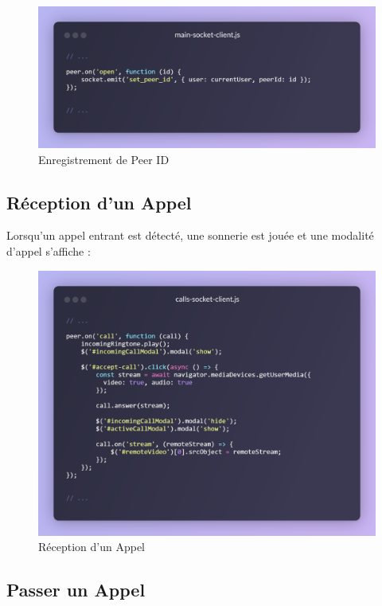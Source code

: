 \begin{figure}[H]
    \centering
    \includegraphics[width=15cm]{assets/annexes/snippet (22).png}
    \caption{ Enregistrement de Peer ID}
\end{figure}

\subsection*{Réception d’un Appel}

Lorsqu'un appel entrant est détecté, une sonnerie est jouée et une modalité d’appel s’affiche :

\begin{figure}[H]
    \centering
    \includegraphics[width=15cm]{assets/annexes/snippet (23).png}
    \caption{ Réception d’un Appel}
\end{figure}

\subsection*{Passer un Appel}

